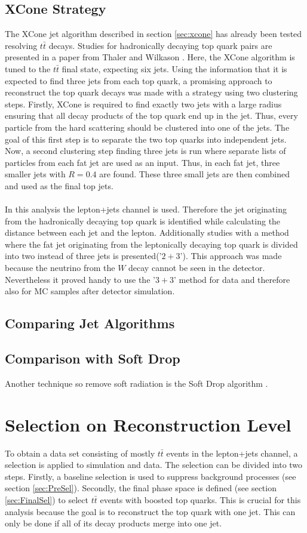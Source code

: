 \subsection{XCone Strategy}
\label{sec:XCone_strat}
	The XCone jet algorithm described in section \ref{sec:xcone} has already been tested resolving $t\bar{t}$ decays. Studies for hadronically decaying top quark pairs are presented in a paper from Thaler and Wilkason \cite{xconetop}. Here, the XCone algorithm is tuned to the $t\bar{t}$ final state, expecting six jets. Using the information that it is expected to find three jets from each top quark, a promising approach to reconstruct the top quark decays was made with a strategy using two clustering steps. Firstly, XCone is required to find exactly two jets with a large radius ensuring that all decay products of the top quark end up in the jet. Thus, every particle from the hard scattering should be clustered into one of the jets. The goal of this first step is to separate the two top quarks into independent jets. Now, a second clustering step finding three jets is run where separate lists of particles from each fat jet are used as an input. Thus, in each fat jet, three smaller jets with $R=0.4$ are found. These three small jets are then combined and used as the final top jets. \\
	\\ In this analysis the lepton+jets channel is used. Therefore the jet originating from the hadronically decaying top quark is identified while calculating the distance between each jet and the lepton. Additionally studies with a method where the fat jet originating from the leptonically decaying top quark is divided into two instead of three jets is presented('$2+3$'). This approach was made because the neutrino from the $W$ decay cannot be seen in the detector. Nevertheless it proved handy to use the '$3+3$' method for data and therefore also for MC samples after detector simulation.   
\subsection{Comparing Jet Algorithms}
\subsection{Comparison with Soft Drop}
	Another technique so remove soft radiation is the Soft Drop algorithm \cite{softdrop}.
\section{Selection on Reconstruction Level}
\label{sec:selection}
	To obtain a data set consisting of mostly $t\bar{t}$ events in the lepton+jets channel, a selection is applied to simulation and data. The selection can be divided into two steps. Firstly, a baseline selection is used to suppress background processes (see section \ref{sec:PreSel}). Secondly, the final phase space is defined (see section \ref{sec:FinalSel}) to select $t\bar{t}$ events with boosted top quarks. This is crucial for this analysis because the goal is to reconstruct the top quark with one jet. This can only be done if all of its decay products merge into one jet.
